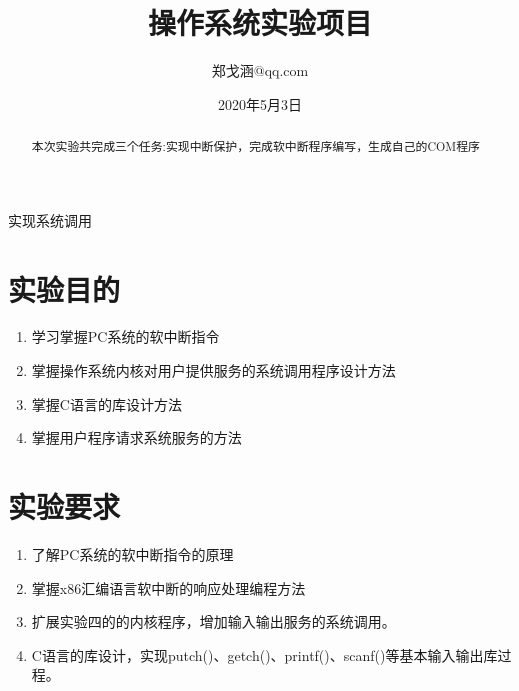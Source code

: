 \documentclass[a4paper, 11pt]{article} %
\title{\textbf{操作系统实验项目}\\ %
} %
\author{郑戈涵\quad 17338233\quad 931252924@qq.com} %
\date{2020年5月3日} %
\makeatletter
\renewcommand{\maketitle}{ %
\begin{center} %
{\LARGE\@title} %

\large{\@subtitle}

\vspace{1em} %

{\large\@author} %

\end{center}
}
\newcommand\@subtitle{实现系统调用}
\makeatother
\begin{document}
\maketitle %


\renewcommand{\abstractname}{摘要} %

\begin{abstract}
  本次实验共完成三个任务:实现中断保护，完成软中断程序编写，生成自己的COM程序
\end{abstract}


\vspace{1em} %

\setcounter{tocdepth}{2}
\renewcommand{\contentsname}{目录}
\tableofcontents


\pagebreak

\section{实验目的}

\begin{enumerate}
  \item 学习掌握PC系统的软中断指令
  \item 掌握操作系统内核对用户提供服务的系统调用程序设计方法
  \item 掌握C语言的库设计方法
  \item 掌握用户程序请求系统服务的方法
\end{enumerate}


\section{实验要求}

\begin{enumerate}
  \item 了解PC系统的软中断指令的原理
  \item 掌握x86汇编语言软中断的响应处理编程方法
  \item 扩展实验四的的内核程序，增加输入输出服务的系统调用。
  \item C语言的库设计，实现putch()、getch()、printf()、scanf()等基本输入输出库过程。
\end{enumerate}
\end{document}
